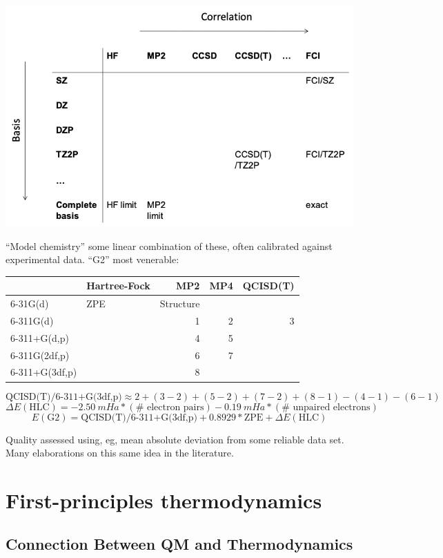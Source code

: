 \documentclass[11pt]{article}
\begin{document}
\begin{center}
\includegraphics[width=.9\linewidth]{./Images/model-chem.png}
\end{center}

``Model chemistry'' some linear combination of these, often calibrated against experimental data. ``G2'' most venerable:

\begin{center}
\begin{tabular}{llrrr}
 & Hartree-Fock & MP2 & MP4 & QCISD(T)\\
\hline
6-31G(d) & ZPE & Structure &  & \\
6-311G(d) &  & 1 & 2 & 3\\
6-311+G(d,p) &  & 4 & 5 & \\
6-311G(2df,p) &  & 6 & 7 & \\
6-311+G(3df,p) &  & 8 &  & \\
\end{tabular}
\end{center}

\[ \text{QCISD(T)/6-311+G(3df,p)} \approx 2 + (3-2) + (5-2) + (7-2) + (8-1) - (4-1) - (6-1)\]
\[ \Delta E(\text{HLC}) = \SI{-2.50}{mHa} * (\text{# electron pairs}) - \SI{0.19}{mHa}* (\text{# unpaired electrons}) \]
\[ E(\text{G2}) = \text{QCISD(T)/6-311+G(3df,p)} + 0.8929 * \text{ZPE} + \Delta E(\text{HLC})\]

Quality assessed using, eg, mean absolute deviation from some reliable data set. Many elaborations on this same idea in the literature.

\newpage
\section{First-principles thermodynamics}
\label{sec:org4119b7d}
\subsection{Connection Between QM and Thermodynamics}
\label{sec:org68ef829}
\end{document}
